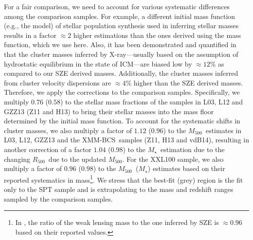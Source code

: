 \documentclass[useAMS,usenatbib,iop,numberedappendix]{mn2e}
\newcommand{\Rfiveoo}{\ensuremath{R_{500}}}
\newcommand{\Mfiveoo}{\ensuremath{M_{500}}}
\newcommand{\XMMBCS}{XMM-BCS}
\newcommand{\Mstar}{\ensuremath{M_{\star}}}
\newcommand{\percent}{\ensuremath{\%}}
\begin{document}
For a fair comparison, we need to account for various systematic differences among the comparison samples.
For example, a different initial mass function (e.g., the \citet{salpeter55} model) of stellar population synthesis used in inferring stellar masses results in a factor $\approx2$ higher estimations than the ones derived using the \citet{chabrier03} mass function, which we use here.
Also, it has been demonstrated and quantified in \cite{bocquet15} that the cluster masses inferred by X-ray---usually based on the assumption of hydrostatic equilibrium in the state of ICM---are biased low by  
$\approx12\percent$
as compared to our SZE derived masses. 
Additionally, the cluster masses inferred from cluster velocity dispersions are $\approx4\percent$ higher
than the SZE derived masses.
Therefore, we apply the corrections to the comparison samples.
Specifically, we multiply $0.76$ ($0.58$) to the stellar mass fractions of the samples in L03, L12 and GZZ13 (Z11 and H13) to bring their stellar masses into the mass floor determined by the \citet{chabrier03} initial mass function.
To account for the systematic shifts in cluster masses, we also multiply a factor of $1.12$ ($0.96$) to the \Mfiveoo\ estimates in L03, L12, GZZ13 and the \XMMBCS\ samples (Z11, H13 and vdB14), resulting in another correction of a factor 
$1.04$ ($0.98$) to the \Mstar\ estimation due to the changing \Rfiveoo\  due to the updated \Mfiveoo.
For the XXL100 sample, we also multiply a factor of $0.96$ ($0.98$) to the \Mfiveoo\ (\Mstar) estimates based on their reported systematics in mass\footnote{In \citet{eckert16}, the ratio of the weak lensing mass to the one inferred by SZE is $\approx0.96$ based on their reported values.}.
We stress that the best-fit (grey) region is the fit only to the SPT sample and is extrapolating to the mass and redshift ranges sampled by the comparison samples.
\end{document}
